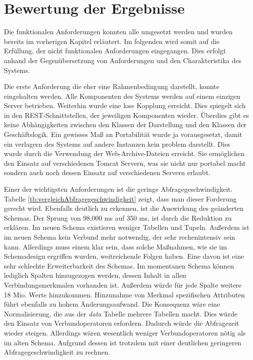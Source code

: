 \section{Bewertung der Ergebnisse}
\label{ch:Ergebnis:sec:bewertung}

Die funktionalen Anforderungen konnten alle umgesetzt werden und wurden bereits im vorherigen Kapitel erläutert. Im folgenden wird somit auf die Erfüllung, der nicht funktionalen Anforderungen eingegangen. Dies erfolgt anhand der Gegenübersetzung von Anforderungen und den Charakteristika des Systems.

Die erste Anforderung die eher eine Rahmenbedingung darstellt, konnte eingehalten werden. Alle Komponenten des Systems werden auf einem einzigen Server betrieben. Weiterhin wurde eine lose Kopplung erreicht. Dies spiegelt sich in den REST-Schnittstellen, der jeweiligen Komponenten wieder. Überdies gibt es keine Abhängigkeiten zwischen den Klassen der Darstellung und den Klassen der Geschäftslogik. Ein gewisses Maß an Portabilität wurde ja vorausgesetzt, damit ein verlagern des Systems auf andere Instanzen kein problem darstellt. Dies wurde durch die Verwendung der Web-Archive-Dateien erreicht. Sie ermöglichen den Einsatz auf verschiedenen Tomcat Servern, was sie nicht nur portabel macht sondern auch noch dessen Einsatz auf verschiedenen Servern erlaubt. 

Einer der wichtigsten Anforderungen ist die geringe Abfragegeschwindigkeit. Tabelle \ref{tb:vergleichAbfragegeschwindigkeit} zeigt, dass man dieser Forderung gerecht wird. Ebenfalls deutlich zu erkennen, ist die Auswirkung des geänderten Schemas. Der Sprung von 98.000 ms auf 350 ms, ist durch die Reduktion zu erklären. Im neuen Schema existieren weniger Tabellen und Tupeln. Außerdem ist im neuen Schema kein Verbund mehr notwendig, der sehr rechenintensiv sein kann. Allerdings muss einem klar sein, dass solche Maßnahmen, wie sie im Schemadesign ergriffen wurden, weitreichende Folgen haben. Eine davon ist eine sehr schlechte Erweiterbarkeit des Schemas. Im momentanen Schema können lediglich Spalten hinzugezogen werden, dessen Inhalt in allen Verbindungsmerkmalen vorhanden ist. Außerdem würde für jede Spalte weitere 18 Mio. Werte hinzukommen. Hinzunahme von Merkmal spezifischen Attributen führt ebenfalls zu hohem Änderungsaufwand. Die Konsequenz wäre eine Normalisierung, die aus der \textit{data} Tabelle mehrere Tabellen macht. Dies würde den Einsatz von Verbundoperatoren erfordern. Dadurch würde die Abfragezeit wieder steigen. Allerdings wären wesentlich weniger Verbundoperatoren nötig als im alten Schema. Aufgrund dessen ist trotzdem mit einer deutlichen geringeren Abfragegeschwindigkeit zu rechnen.  

